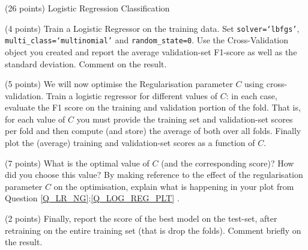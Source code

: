 \documentclass[12pt]{article}
\begin{document}
\begin{question}{(26 points) Logistic Regression Classification}
\begin{subquestion}{(4 points) Train a Logistic Regressor on the training data. Set \texttt{solver=`lbfgs'}, \texttt{multi\_class=`multinomial'} and \texttt{random\_state=0}. Use the Cross-Validation object you created and report the average validation-set F1-score as well as the standard deviation. Comment on the result.}






\end{subquestion}

\begin{subquestion}{\label{Q_LOG_REG_PLT}(5 points) We will now optimise the Regularisation parameter $C$ using cross-validation. Train a logistic regressor for different values of $C$: in each case, evaluate the F1 score on the training and validation portion of the fold. That is, for each value of $C$ you must provide the training set and validation-set scores per fold and then compute (and store) the average of both over all folds. Finally plot the (average) training and validation-set scores as a function of $C$. }






\end{subquestion}

\begin{subquestion}{(7 points) What is the optimal value of $C$ (and the corresponding score)? How did you choose this value? By making reference to the effect of the regularisation parameter $C$ on the optimisation, explain what is happening in your plot from Question \ref{Q_LR_NG}:\ref{Q_LOG_REG_PLT} .}






\end{subquestion}

\begin{subquestion}{(2 points) Finally, report the score of the best model on the test-set, after retraining on the entire training set (that is drop the folds).  Comment briefly on the result.}






\end{subquestion}


\end{question}
\end{document}
